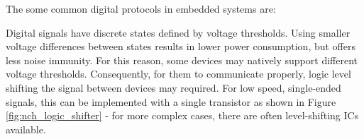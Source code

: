 \documentclass[main.tex]{subfiles}
\begin{document}
The some common digital protocols in embedded systems are:
\begin{table}[H]
    \centering
    \caption{Digital Protocol Definitions}
    \label{tab:digital_protocols}
\end{table}

\noindent Digital signals have discrete states defined by voltage thresholds. Using smaller voltage differences between states results in lower power consumption, but offers less noise immunity. For this reason, some devices may natively support different voltage thresholds. Consequently, for them to communicate properly, logic level shifting the signal between devices may required. For low speed, single-ended signals, this can be implemented with a single transistor as shown in Figure \ref{fig:nch_logic_shifter} - for more complex cases, there are often level-shifting ICs available. 
\end{document}
